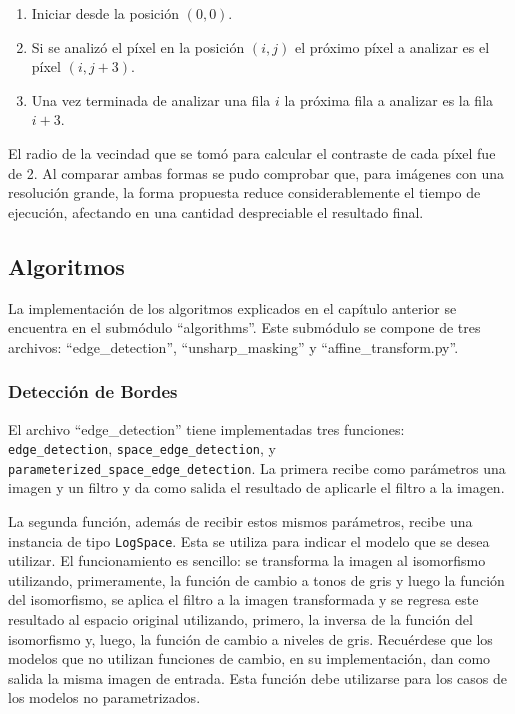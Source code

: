 \begin{enumerate}
	\item Iniciar desde la posici\'on $(0,0)$.
	\item Si se analiz\'o el p\'ixel en la posici\'on $(i,j)$ el pr\'oximo p\'ixel a analizar es el p\'ixel $(i,j+3)$.
	\item Una vez terminada de analizar una fila $i$ la pr\'oxima fila a analizar es la fila $i+3$.
\end{enumerate}

El radio de la vecindad que se tom\'o para calcular el contraste de cada p\'ixel fue de 2. Al comparar ambas formas se pudo comprobar que, para im\'agenes con una resoluci\'on grande, la forma propuesta reduce considerablemente el tiempo de ejecuci\'on, afectando en una cantidad despreciable el resultado final.

\subsection{Algoritmos}

La implementaci\'on de los algoritmos explicados en el cap\'itulo anterior se encuentra en el subm\'odulo ``algorithms''. Este subm\'odulo se compone de tres archivos: ``edge\_detection'', ``unsharp\_masking'' y ``affine\_transform.py''.

\subsubsection{Detecci\'on de Bordes}

El archivo ``edge\_detection'' tiene implementadas tres funciones: \verb|edge_detection|, \verb|space_edge_detection|, y \verb|parameterized_space_edge_detection|. La primera recibe como par\'ametros una imagen y un filtro y da como salida el resultado de aplicarle el filtro a la imagen. 

La segunda funci\'on, adem\'as de recibir estos mismos par\'ametros, recibe una instancia de tipo \verb|LogSpace|. Esta se utiliza para indicar el modelo que se desea utilizar. El funcionamiento es sencillo: se transforma la imagen al isomorfismo utilizando, primeramente, la funci\'on de cambio a tonos de gris y luego la funci\'on del isomorfismo, se aplica el filtro a la imagen transformada y se regresa este resultado al espacio original utilizando, primero, la inversa de la funci\'on del isomorfismo y, luego, la funci\'on de cambio a niveles de gris. Recu\'erdese que los modelos que no utilizan funciones de cambio, en su implementaci\'on, dan como salida la misma imagen de entrada. Esta funci\'on debe utilizarse para los casos de los modelos no parametrizados.

